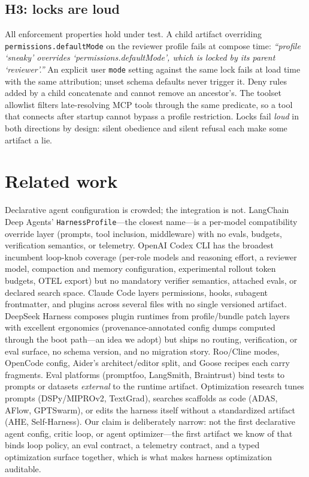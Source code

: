 \documentclass[10pt]{article}
\begin{document}
\subsection{H3: locks are loud}

All enforcement properties hold under test. A child artifact overriding \texttt{permissions.defaultMode}
on the reviewer profile fails at compose time: \emph{``profile `sneaky' overrides
`permissions.defaultMode', which is locked by its parent `reviewer'.''} An explicit user
\texttt{mode} setting against the same lock fails at load time with the same attribution; unset schema
defaults never trigger it. Deny rules added by a child concatenate and cannot remove an ancestor's.
The toolset allowlist filters late-resolving MCP tools through the same predicate, so a tool that
connects after startup cannot bypass a profile restriction. Locks fail \emph{loud} in both directions
by design: silent obedience and silent refusal each make some artifact a lie.

\section{Related work}

Declarative agent configuration is crowded; the integration is not. LangChain Deep Agents'
\texttt{HarnessProfile}---the closest name---is a per-model compatibility override layer (prompts, tool
inclusion, middleware) with no evals, budgets, verification semantics, or telemetry. OpenAI Codex CLI
has the broadest incumbent loop-knob coverage (per-role models and reasoning effort, a reviewer model,
compaction and memory configuration, experimental rollout token budgets, OTEL export) but no mandatory
verifier semantics, attached evals, or declared search space. Claude Code layers permissions, hooks,
subagent frontmatter, and plugins across several files with no single versioned artifact. DeepSeek
Harness composes plugin runtimes from profile/bundle patch layers with excellent ergonomics
(provenance-annotated config dumps computed through the boot path---an idea we adopt) but ships no
routing, verification, or eval surface, no schema version, and no migration story. Roo/Cline modes,
OpenCode config, Aider's architect/editor split, and Goose recipes each carry fragments. Eval
platforms (promptfoo, LangSmith, Braintrust) bind tests to prompts or datasets \emph{external} to the
runtime artifact. Optimization research tunes prompts (DSPy/MIPROv2, TextGrad), searches scaffolds as
code (ADAS, AFlow, GPTSwarm), or edits the harness itself without a standardized artifact (AHE,
Self-Harness). Our claim is deliberately narrow: not the first declarative agent config, critic loop,
or agent optimizer---the first artifact we know of that binds loop policy, an eval contract, a
telemetry contract, and a typed optimization surface together, which is what makes harness
optimization auditable.
\end{document}
